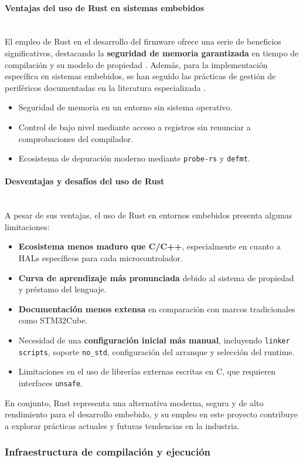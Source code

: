 \documentclass[11pt,a4paper]{article}
\newcommand{\myparagraph}[1]{\paragraph{#1}\mbox{}\\}
\begin{document}
\myparagraph{Ventajas del uso de Rust en sistemas embebidos}

El empleo de Rust en el desarrollo del firmware ofrece una serie de beneficios significativos, destacando la \textbf{seguridad de memoria garantizada} en tiempo de compilación y su modelo de propiedad \cite{rustbook}. Además, para la implementación específica en sistemas embebidos, se han seguido las prácticas de gestión de periféricos documentadas en la literatura especializada \cite{matthes2023}.

\begin{itemize}
    \item Seguridad de memoria en un entorno sin sistema operativo.
    \item Control de bajo nivel mediante acceso a registros sin renunciar a comprobaciones del compilador.
    \item Ecosistema de depuración moderno mediante \texttt{probe-rs} y \texttt{defmt}.
\end{itemize}

\myparagraph{Desventajas y desafíos del uso de Rust}

A pesar de sus ventajas, el uso de Rust en entornos embebidos presenta algunas limitaciones:

\begin{itemize}
    \item \textbf{Ecosistema menos maduro que C/C++}, especialmente en cuanto a HALs específicos para cada microcontrolador.
    \item \textbf{Curva de aprendizaje más pronunciada} debido al sistema de propiedad y préstamo del lenguaje.
    \item \textbf{Documentación menos extensa} en comparación con marcos tradicionales como STM32Cube.
    \item Necesidad de una \textbf{configuración inicial más manual}, incluyendo \texttt{linker scripts}, soporte \texttt{no\_std}, configuración del arranque y selección del runtime.
    \item Limitaciones en el uso de librerías externas escritas en C, que requieren interfaces \texttt{unsafe}.
\end{itemize}

En conjunto, Rust representa una alternativa moderna, segura y de alto rendimiento para el desarrollo embebido, y su empleo en este proyecto contribuye a explorar prácticas actuales y futuras tendencias en la industria.

\subsubsection{Infraestructura de compilación y ejecución}
\end{document}
